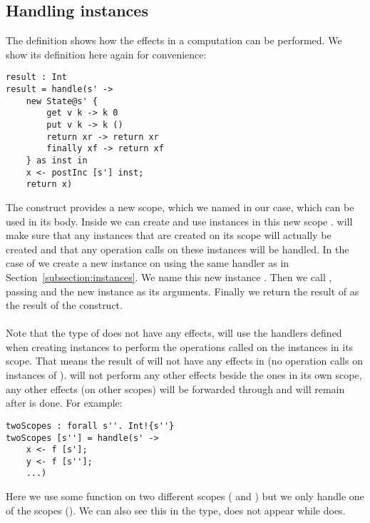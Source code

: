 \subsection{Handling instances}
The definition  shows how the effects in a computation can be performed.
We show its definition here again for convenience:

\begin{verbatim}
result : Int
result = handle(s' ->
	new State@s' {
		get v k -> k 0
		put v k -> k ()
		return xr -> return xr
		finally xf -> return xf
	} as inst in
	x <- postInc [s'] inst;
	return x)
\end{verbatim}

The  construct provides a new scope, which we named  in our case, which can be used in its body.
Inside  we can create and use instances in this new scope .
 will make sure that any instances that are created on its scope will actually be created and that any operation calls on these instances will be handled.
In the case of  we create a new  instance on  using the same handler as in Section~\ref{subsection:instances}.
We name this new instance .
Then we call , passing  and the new instance as its arguments.
Finally we return the result of  as the result of the  construct.
\\\\
Note that the type of  does not have any effects,  will use the handlers defined when creating instances to perform the operations called on the instances in its scope.
That means the result of  will not have any effects in  (no operation calls on instances of ).
 will not perform any other effects beside the ones in its own scope, any other effects (on other scopes) will be forwarded through and will remain after  is done.
For example:

\begin{verbatim}
twoScopes : forall s''. Int!{s''}
twoScopes [s''] = handle(s' ->
	x <- f [s'];
	y <- f [s''];
	...)
\end{verbatim}

Here we use some function  on two different scopes ( and ) but we only handle one of the scopes ().
We can also see this in the type,  does not appear while  does. 

